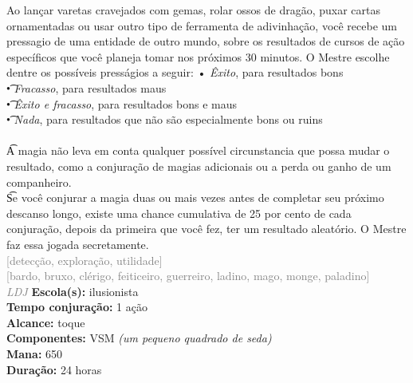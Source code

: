 \documentclass{RPG_Adventure}[2021/10/20]
\begin{document}
{\normalsize Ao lançar varetas cravejados com gemas, rolar ossos de dragão, puxar cartas ornamentadas ou usar outro tipo de ferramenta de adivinhação, você recebe um pressagio de uma entidade de outro mundo, sobre os resultados de cursos de ação específicos que você planeja tomar nos próximos 30 minutos. O Mestre escolhe dentre os possíveis presságios a seguir: • \textit{Êxito}, para resultados bons\\\t • \textit{Fracasso}, para resultados maus\\\t • \textit{Êxito e fracasso}, para resultados bons e maus\\\t • \textit{Nada}, para resultados que não são especialmente bons ou ruins\\\\\t A magia não leva em conta qualquer possível circunstancia que possa mudar o resultado, como a conjuração de magias adicionais ou a perda ou ganho de um companheiro.\\\t Se você conjurar a magia duas ou mais vezes antes de completar seu próximo descanso longo, existe uma chance cumulativa de 25 por cento de cada conjuração, depois da primeira que você fez, ter um resultado aleatório. O Mestre faz essa jogada secretamente.\\}
{\scriptsize \textcolor{gray}{[detecção, exploração, utilidade]\\}}
{\scriptsize \textcolor{gray}{[bardo, bruxo, clérigo, feiticeiro, guerreiro, ladino, mago, monge, paladino]\\}}
{\tiny \textcolor{gray}{\textit{LDJ}}}\jump{}
{\small \t \textbf{Escola(s):} ilusionista\\\t \textbf{Tempo conjuração:} 1 ação\\\t \textbf{Alcance:} toque\\\t \textbf{Componentes:} VSM \textit{(um pequeno quadrado de seda)}\\\t \textbf{Mana:} 650\\\t \textbf{Duração:} 24 horas\\}
\end{document}
